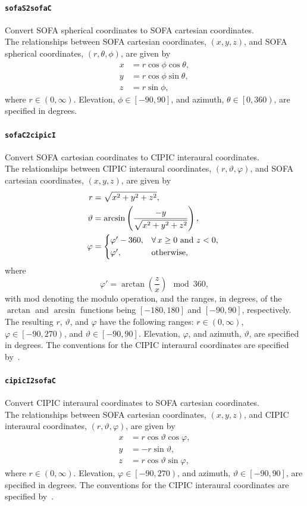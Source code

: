 \documentclass[11pt, oneside]{article}
\newcommand{\function}[1]{\paragraph*{\texttt{#1}}}
\begin{document}
\function{sofaS2sofaC} Convert SOFA spherical coordinates to SOFA cartesian coordinates. \\
The relationships between SOFA cartesian coordinates, $\left(x,y,z\right)$, and SOFA spherical coordinates, $\left(r,\theta,\phi\right)$, are given by
\begin{align}
x &= r \cos \phi \cos \theta, \\
y &= r \cos \phi \sin \theta, \\
z &= r \sin \phi,
\end{align}
where $r \in (0,\infty)$.
Elevation, $\phi \in \left[-90,90\right]$, and azimuth, $\theta \in \left[0,360\right)$, are specified in degrees.

\function{sofaC2cipicI} Convert SOFA cartesian coordinates to CIPIC interaural coordinates. \\
The relationships between CIPIC interaural coordinates, $\left(r,\vartheta,\varphi\right)$, and SOFA cartesian coordinates, $\left(x,y,z\right)$, are given by
\begin{align}
r &= \sqrt{x^2 + y^2 + z^2}, \\
\vartheta &= \arcsin \left(\frac{-y}{\sqrt{x^2 + y^2 + z^2}}\right), \\
\varphi &= 
\begin{cases*}
\varphi' - 360, & $\forall\,x \geq 0$ and $z < 0$, \\
\varphi', & otherwise,
\end{cases*}
\end{align}
where
\begin{equation}
\varphi' =  \arctan \left(\frac{z}{x}\right) \mod 360,
\end{equation}
with mod denoting the modulo operation, and the ranges, in degrees, of the $\arctan$ and $\arcsin$ functions being $\left[-180,180\right]$ and $\left[-90,90\right]$, respectively.
The resulting $r$, $\vartheta$, and $\varphi$ have the following ranges: $r \in (0,\infty)$, $\varphi \in \left[-90,270\right)$, and $\vartheta \in \left[-90,90\right]$.
Elevation, $\varphi$, and azimuth, $\vartheta$, are specified in degrees.
The conventions for the CIPIC interaural coordinates are specified by~\citet{Algazi2001}.

\function{cipicI2sofaC} Convert CIPIC interaural coordinates to SOFA cartesian coordinates. \\
The relationships between SOFA cartesian coordinates, $\left(x,y,z\right)$, and CIPIC interaural coordinates, $\left(r,\vartheta,\varphi\right)$, are given by
\begin{align}
x &= r \cos \vartheta \cos \varphi, \\
y &= -r \sin \vartheta, \\
z &= r \cos \vartheta \sin \varphi,
\end{align}
where $r \in (0,\infty)$.
Elevation, $\varphi \in \left[-90,270\right)$, and azimuth, $\vartheta \in \left[-90,90\right]$, are specified in degrees.
The conventions for the CIPIC interaural coordinates are specified by~\citet{Algazi2001}.
\end{document}
